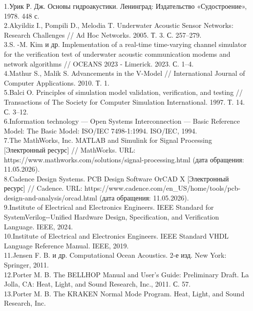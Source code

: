 \documentclass[
    numbers=section,
    document-code={ВКРБ--09.03.04--10.19--XX--26--81}
]{../latex/fqw}
\providecommand{\hl}[1]{#1}
\begin{document}
    \hl{1.Урик Р. Дж. Основы гидроакустики. Ленинград: Издательство
    «Судостроение», 1978. 448 с.\\
    2.Akyildiz I., Pompili D., Melodia T. Underwater Acoustic Sensor
    Networks: Research Challenges // Ad Hoc Networks. 2005. Т. 3. С.
    257--279.\\
    3.S. -M. Kim и др. Implementation of a real-time time-varying channel
    simulator for the verification test of underwater acoustic communication
    modems and network algorithms // OCEANS 2023 - Limerick. 2023. С.
    1--4.\\
    4.Mathur S., Malik S. Advancements in the V-Model // International
    Journal of Computer Applications. 2010. Т. 1.\\
    5.Balci O. Principles of simulation model validation, verification, and
    testing // Transactions of The Society for Computer Simulation
    International. 1997. Т. 14. С. 3--12.\\
    6.Information technology --- Open Systems Interconnection --- Basic
    Reference Model: The Basic Model: ISO/IEC 7498-1:1994. ISO/IEC, 1994.\\
    7.The MathWorks, Inc. MATLAB and Simulink for Signal Processing
            {[}Электронный ресурс{]} // MathWorks. URL:
        https://www.mathworks.com/solutions/signal-processing.html (дата
        обращения: 11.05.2026).\\
        8.Cadence Design Systems. PCB Design Software \textbar{} OrCAD X
            {[}Электронный ресурс{]} // Cadence. URL:
        https://www.cadence.com/en\_US/home/tools/pcb-design-and-analysis/orcad.html
        (дата обращения: 11.05.2026).\\
        9.Institute of Electrical and Electronics Engineers. IEEE Standard for
        SystemVerilog-\/-Unified Hardware Design, Specification, and
        Verification Language. IEEE, 2024.\\
        10.Institute of Electrical and Electronics Engineers. IEEE Standard VHDL
        Language Reference Manual. IEEE, 2019.\\
        11.Jensen F. B. и др. Computational Ocean Acoustics. 2-е изд. New York:
        Springer, 2011.\\
        12.Porter M. B. The BELLHOP Manual and User's Guide: Preliminary Draft.
        La Jolla, CA: Heat, Light, and Sound Research, Inc., 2011. С. 57.\\
        13.Porter M. B. The KRAKEN Normal Mode Program. Heat, Light, and Sound
        Research, Inc.\\
}
\end{document}
